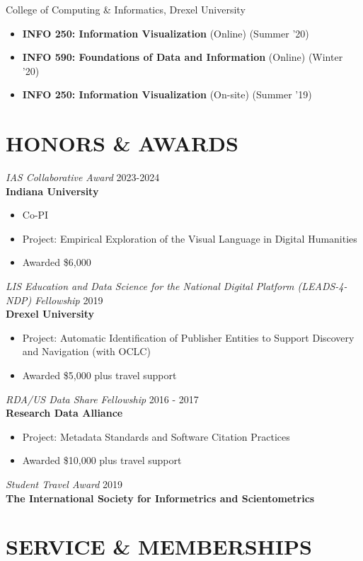 \documentclass[margin, 10pt]{res} %
\begin{document}
\begin{resume}
College of Computing \& Informatics, Drexel University

\begin{itemize}
\item \textbf{INFO 250: Information Visualization} (Online) (Summer '20)
\item \textbf{INFO 590: Foundations of Data and Information} (Online) (Winter '20)
\item \textbf{INFO 250: Information Visualization} (On-site) (Summer '19)
\end{itemize}

\section{HONORS \& AWARDS}


{\sl IAS Collaborative Award}  \hfill 2023-2024 \\
\textbf{Indiana University}
\begin{itemize}
\item Co-PI
\item Project: Empirical Exploration of the Visual Language in Digital Humanities
\item Awarded \$6,000
\end{itemize} 

{\sl LIS Education and Data Science for the National Digital Platform (LEADS-4-NDP) Fellowship}  \hfill 2019 \\
\textbf{Drexel University}
\begin{itemize}
\item Project: Automatic Identification of Publisher Entities to Support Discovery and Navigation (with OCLC)
\item Awarded \$5,000 plus travel support
\end{itemize} 

{\sl RDA/US Data Share Fellowship}  \hfill 2016 - 2017 \\
\textbf{Research Data Alliance}
\begin{itemize}
\item Project: Metadata Standards and Software Citation Practices
\item Awarded \$10,000 plus travel support
\end{itemize} 

{\sl Student Travel Award} \hfill 2019 \\
\textbf{The International Society for Informetrics and Scientometrics}

\section{SERVICE \& MEMBERSHIPS}


\end{resume}
\end{document}
